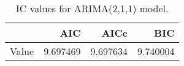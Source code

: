 \begin{table}[ht]
\centering
\begin{tabular}{rrrr}
  \hline
 & AIC & AICc & BIC \\ 
  \hline
Value & 9.697469 & 9.697634 & 9.740004 \\ 
   \hline
\end{tabular}
\caption{IC values for ARIMA(2,1,1) model.}
\end{table}